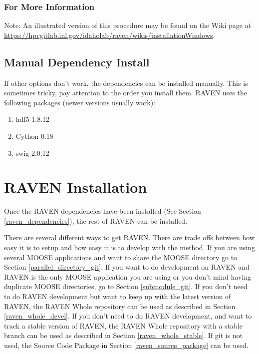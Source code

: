 \subsubsection{For More Information}
Note: An illustrated version of this procedure may be found on the Wiki page at
\url{https://hpcgitlab.inl.gov/idaholab/raven/wikis/installationWindows}.

\subsection{Manual Dependency Install}
\label{sysprep_manual}

If other options don't work, the dependencies can be installed
manually.  This is sometimes tricky, pay attention to the order you
install them.  RAVEN uses the following packages (newer versions
usually work):

\begin{enumerate}
  
\item hdf5-1.8.12
\item Cython-0.18
\item swig-2.0.12
\end{enumerate}

\goToRavenInstallation

\section{RAVEN Installation}
\label{raven_installation}

Once the RAVEN dependencies have been installed (See Section
\ref{raven_dependencies}), the rest of RAVEN can be installed.

There are several different ways to get RAVEN.  There are trade offs
between how easy it is to setup and how easy it is to develop with the
method.  If you are using several MOOSE applications and want to share
the MOOSE directory go to Section \ref{parallel_directory_git}.  If
you want to do development on RAVEN and RAVEN is the only MOOSE
application you are using or you don't mind having duplicate MOOSE
directories, go to Section \ref{submodule_git}.  If you don't need to
do RAVEN development but want to keep up with the latest version of
RAVEN, the RAVEN Whole repository can be used as described in Section
\ref{raven_whole_devel}.  If you don't need to do RAVEN development,
and want to track a stable version of RAVEN, the RAVEN Whole
repository with a stable branch can be used as described in Section
\ref{raven_whole_stable}.  If git is not used, the Source Code
Package in Section \ref{raven_source_package} can be used.

